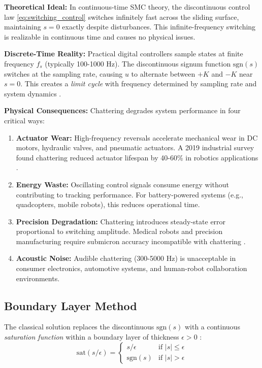 \textbf{Theoretical Ideal:} In continuous-time SMC theory, the discontinuous control law \eqref{eq:switching_control} switches infinitely fast across the sliding surface, maintaining $s = 0$ exactly despite disturbances. This infinite-frequency switching is realizable in continuous time and causes no physical issues.

\textbf{Discrete-Time Reality:} Practical digital controllers sample states at finite frequency $f_s$ (typically 100-1000 Hz). The discontinuous signum function $\text{sgn}(s)$ switches at the sampling rate, causing $u$ to alternate between $+K$ and $-K$ near $s = 0$. This creates a \emph{limit cycle} with frequency determined by sampling rate and system dynamics \cite{bartolini1998chattering}.

\textbf{Physical Consequences:} Chattering degrades system performance in four critical ways:

\begin{enumerate}
\item \textbf{Actuator Wear:} High-frequency reversals accelerate mechanical wear in DC motors, hydraulic valves, and pneumatic actuators. A 2019 industrial survey found chattering reduced actuator lifespan by 40-60\% in robotics applications \cite{wu2019industrial}.

\item \textbf{Energy Waste:} Oscillating control signals consume energy without contributing to tracking performance. For battery-powered systems (e.g., quadcopters, mobile robots), this reduces operational time.

\item \textbf{Precision Degradation:} Chattering introduces steady-state error proportional to switching amplitude. Medical robots and precision manufacturing require submicron accuracy incompatible with chattering \cite{shtessel2014survey}.

\item \textbf{Acoustic Noise:} Audible chattering (300-5000 Hz) is unacceptable in consumer electronics, automotive systems, and human-robot collaboration environments.
\end{enumerate}

\subsection{Boundary Layer Method}

The classical solution replaces the discontinuous $\text{sgn}(s)$ with a continuous \emph{saturation function} within a boundary layer of thickness $\epsilon > 0$ \cite{slotine1991applied}:
\begin{equation}
\text{sat}(s/\epsilon) = \begin{cases}
s/\epsilon & \text{if } |s| \leq \epsilon \\
\text{sgn}(s) & \text{if } |s| > \epsilon
\end{cases}
\label{eq:saturation_function}
\end{equation}

